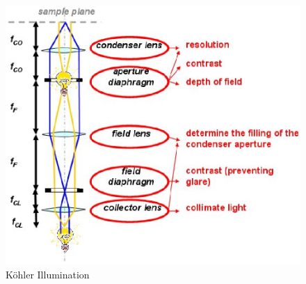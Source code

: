 \documentclass[a4paper]{report}
\begin{document}
\begin{figure}[h]
\center
\includegraphics[width=5in]{koehler.eps}
\caption{K\"{o}hler Illumination}
\label{koehler}
\end{figure}
\end{document}
